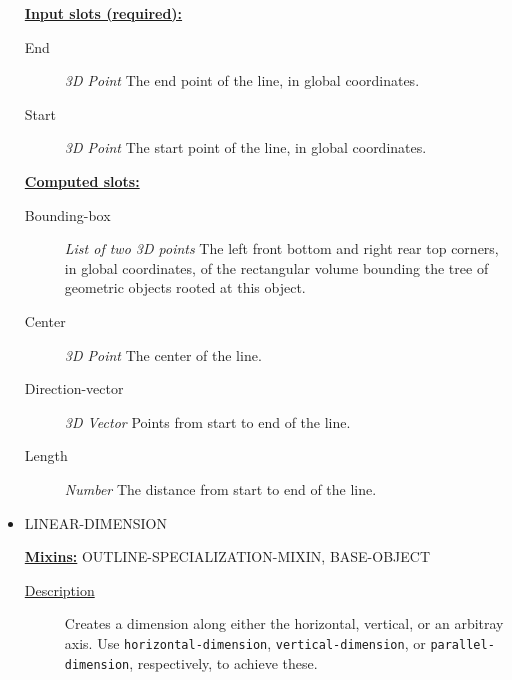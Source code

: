 \documentclass [11pt]{book}
\begin{document}
\begin{itemize}
\textbf{
\underline{Input slots (required):}}

\begin{description}

\item [End]
\emph{3D Point} The end point of the line, in global coordinates.


\item [Start]
\emph{3D Point} The start point of the line, in global coordinates.


\end{description}






\textbf{
\underline{Computed slots:}}

\begin{description}

\item [Bounding-box]
\emph{List of two 3D points} The left front bottom and right rear top corners, in global coordinates,
of the rectangular volume bounding the tree of geometric objects rooted at this object.


\item [Center]
\emph{3D Point} The center of the line.


\item [Direction-vector]
\emph{3D Vector} Points from start to end of the line.


\item [Length]
\emph{Number} The distance from start to end of the line.


\end{description}







\item {}LINEAR-DIMENSION


\textbf{
\underline{Mixins:}} OUTLINE-SPECIALIZATION-MIXIN, BASE-OBJECT





\begin{description}

\item [
\underline{Description}]


Creates a dimension along either the horizontal, vertical, or an arbitray axis. Use
\texttt{horizontal-dimension}, \texttt{vertical-dimension}, or \texttt{parallel-dimension}, respectively, to achieve these.




\end{description}
\end{itemize}
\end{document}
